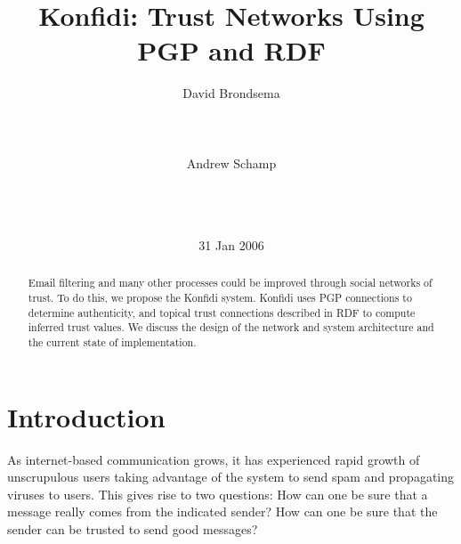 \documentclass[letterpaper]{www2006-submission}
\begin{document}

\title{Konfidi: Trust Networks Using PGP and RDF}


\author{
\alignauthor David Brondsema\\
       \\
       \\
       \\
\alignauthor Andrew Schamp\\
       \\
       \\
       \\
}

\date{31 Jan 2006}

\maketitle
\begin{abstract}
Email filtering and many other processes could be improved through social networks of trust.  To do this, we propose the Konfidi system.  Konfidi uses PGP connections to determine authenticity, and topical trust connections described in RDF to compute inferred trust values.  We discuss the design of the network and system architecture and the current state of implementation.
\end{abstract}


\section{Introduction}
As internet-based communication grows, it has experienced rapid growth of unscrupulous users taking advantage of the system to send spam and propagating viruses to users.  This gives rise to two questions: 
How can one be sure that a message really comes from the indicated sender?  How can one be sure that the sender can be trusted to send good messages?
\end{document}
